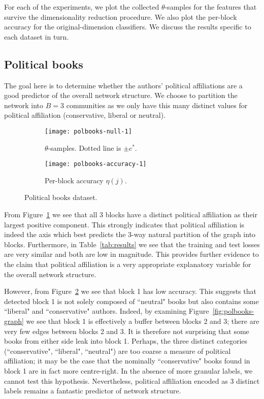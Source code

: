 For each of the experiments, we plot the collected $\theta$-samples for the features that survive the dimensionality reduction procedure. We also plot the per-block accuracy for the original-dimension classifiers. We discuss the results specific to each dataset in turn.

\subsection{Political books}

The goal here is to 
determine whether the authors' political affiliations are a good predictor 
of the overall network structure. We choose to partition the network into $B=3$ communities as we only have this many distinct values for political affiliation (conservative, liberal or neutral).
%
\begin{figure}[!h]
	\centering
	\begin{subfigure}[t]{0.452\linewidth}
		\centering
		\vskip 0pt
		\texttt{[image: polbooks-null-1]}
		\caption{$\theta$-samples. Dotted line is $\pm c^*$.}
		\label{fig:polbooks-null}
	\end{subfigure}
	\begin{subfigure}[t]{0.45\linewidth}
		\centering
		\vskip 0pt
		\texttt{[image: polbooks-accuracy-1]}
		\caption{Per-block accuracy $\eta(j)$.}
		\label{fig:polbooks-accuracy}
	\end{subfigure}
	\caption{Political books dataset.}
	\label{fig:polbooks}
\end{figure}

From Figure~\ref{fig:polbooks-null} we see that all 3 blocks have a distinct political affiliation as their largest positive component. 
This strongly indicates that political affiliation is indeed the axis 
which best predicts the 3-way natural partition of the graph into blocks. 
Furthermore, in Table~\ref{tab:results} we see that the training and test losses 
are very similar and both are low in magnitude. This provides further evidence 
to the claim that political affiliation is a very appropriate explanatory 
variable for the overall network structure.

However, from Figure~\ref{fig:polbooks-accuracy} we see that block 1 has low accuracy. 
This suggests that detected block 1 is not solely composed of ``neutral" books but also 
contains some ``liberal" and ``conservative" authors. Indeed, by examining 
Figure~\ref{fig:polbooks-graph} we see that block 1 is effectively a buffer between 
blocks 2 and 3; there are very few edges between blocks 2 and 3. It is therefore not 
surprising that some books from either side leak into block 1.
Perhaps, the three distinct categories (``conservative", ``liberal", ``neutral") are 
too coarse a measure of political affiliation; it may be the case that the nominally 
``conservative" books found in block 1 are in fact more centre-right. 
In the absence of more granular labels, we cannot test this hypothesis. 
Nevertheless, political affiliation encoded as 3 distinct labels 
remains a fantastic predictor of network structure.

